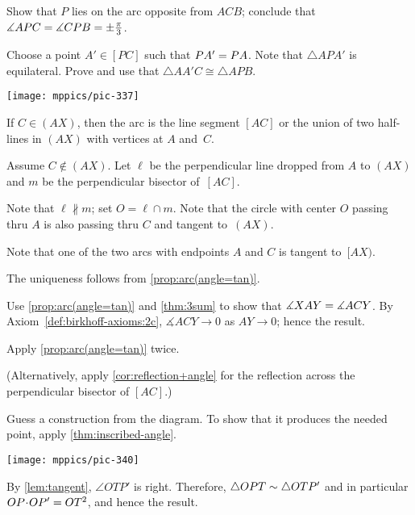 Show that $P$ lies on the arc opposite from $ACB$;
conclude that
$\measuredangle APC=\measuredangle CPB=\pm\tfrac\pi3$.

Choose a point $A'\in [PC]$ such that $PA'=PA$.
Note that $\triangle APA'$ is equilateral.
Prove and use that $\triangle AA'C\cong \triangle APB$.

\begin{Figure}
\centering
\texttt{[image: mppics/pic-337]}
\end{Figure}

If $C\in (AX)$, then the arc is the line segment $[AC]$ or the union of two half-lines in $(AX)$ with vertices at $A$ and~$C$.

Assume $C\notin (AX)$.
Let $\ell$ be the perpendicular line dropped from $A$ to $(AX)$ and $m$ be the perpendicular bisector of~$[AC]$.

Note that $\ell\nparallel m$;
set $O=\ell\cap m$.
Note that the circle with center $O$ passing thru $A$ is also passing thru $C$ and tangent to~$(AX)$.


Note that one of the two arcs with endpoints $A$ and $C$ is tangent to~$[AX)$.

The uniqueness follows from \ref{prop:arc(angle=tan)}.

 Use \ref{prop:arc(angle=tan)} and \ref{thm:3sum} to show that 
$\measuredangle XAY=\measuredangle ACY$.
By Axiom~\ref{def:birkhoff-axioms:2c}, $\measuredangle ACY\to 0$ as $AY\to 0$;
hence the result.

Apply \ref{prop:arc(angle=tan)} twice.

(Alternatively, apply \ref{cor:reflection+angle} for the reflection across the perpendicular bisector of $[AC]$.)

 Guess a construction from the diagram.
To show that it produces the needed point, apply \ref{thm:inscribed-angle}.

\begin{Figure}
\vskip-0mm
\centering
\texttt{[image: mppics/pic-340]}
\end{Figure}

\setcounter{eqtn}{0}

By \ref{lem:tangent}, $\angle OTP'$ is right. 
Therefore, $\triangle OPT\sim \triangle OTP'$
and in particular
$OP\cdot OP'\z=OT^2$,
and hence the result.

